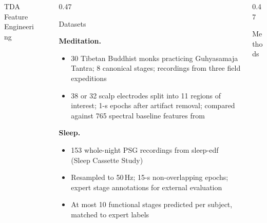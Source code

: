 \documentclass[final]{beamer}
\newlength{\sepwid}
\newlength{\onecolwid}
\newlength{\twocolwid}
\begin{document}
\begin{frame}[t]
\begin{columns}[t]
\begin{column}{\onecolwid}
\begin{block}{TDA Feature Engineering}
\end{block}

\end{column}

\begin{column}{\sepwid}\end{column}

\begin{column}{\twocolwid}

\begin{columns}[T,totalwidth=\dimexpr\twocolwid-0.4cm\relax]

\begin{column}{0.47\textwidth}

\begin{block}{Datasets}

\textbf{Meditation.}
\begin{itemize}
\item 30 Tibetan Buddhist monks practicing Guhyasamaja Tantra; 8 canonical stages; recordings from three field expeditions
\item 38 or 32 scalp electrodes split into 11 regions of interest; 1-s epochs after artifact removal; compared against 765 spectral baseline features from \cite{SDA}
\end{itemize}

\vspace{0.08in}
\textbf{Sleep.}
\begin{itemize}
\item 153 whole-night PSG recordings from sleep-edf~\cite{SleepEdf} (Sleep Cassette Study)
\item Resampled to 50\,Hz; 15-s non-overlapping epochs; expert stage annotations for external evaluation
\item At most 10 functional stages predicted per subject, matched to expert labels
\end{itemize}

\end{block}

\end{column}

\begin{column}{0.47\textwidth}

\begin{block}{Methods}


\end{block}
\end{column}
\end{columns}
\end{column}
\end{columns}
\end{frame}
\end{document}
